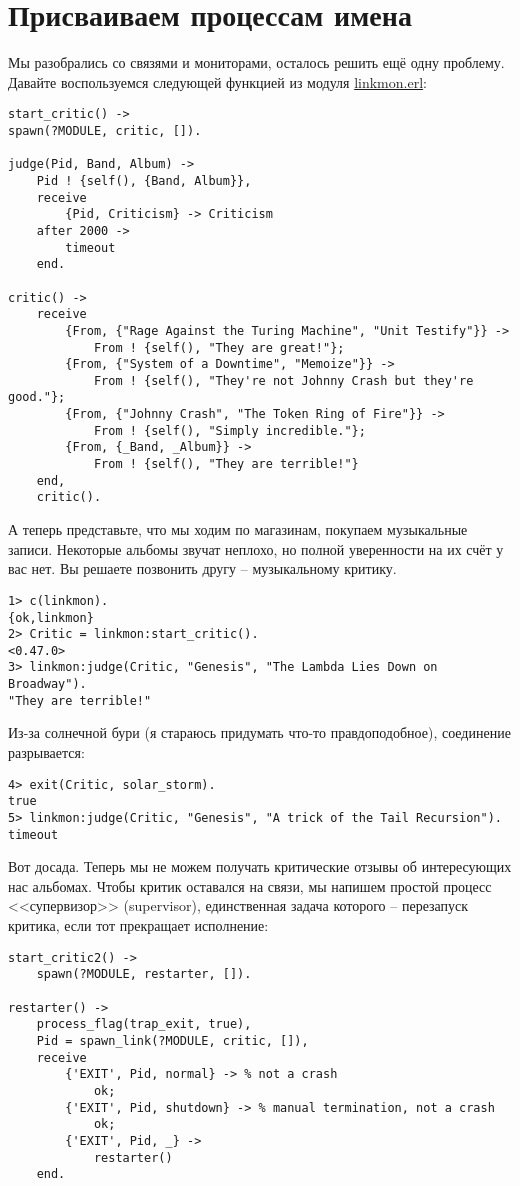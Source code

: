 \section{Присваиваем процессам имена}
\label{naming-processes}
Мы разобрались со связями и мониторами, осталось решить ещё одну проблему.
Давайте воспользуемся следующей функцией из модуля \href{http://learnyousomeerlang/original/learnyousomeerlang.com/static/erlang/linkmon.erl}{linkmon.erl}:
\begin{lstlisting}[style=erlang]
start_critic() ->
spawn(?MODULE, critic, []).
 
judge(Pid, Band, Album) ->
    Pid ! {self(), {Band, Album}},
    receive
        {Pid, Criticism} -> Criticism
    after 2000 ->
        timeout
    end.
 
critic() ->
    receive
        {From, {"Rage Against the Turing Machine", "Unit Testify"}} ->
            From ! {self(), "They are great!"};
        {From, {"System of a Downtime", "Memoize"}} ->
            From ! {self(), "They're not Johnny Crash but they're good."};
        {From, {"Johnny Crash", "The Token Ring of Fire"}} ->
            From ! {self(), "Simply incredible."};
        {From, {_Band, _Album}} ->
            From ! {self(), "They are terrible!"}
    end,
    critic().
\end{lstlisting}

А теперь представьте, что мы ходим по магазинам, покупаем музыкальные записи.
Некоторые альбомы звучат неплохо, но полной уверенности на их счёт у вас нет.
Вы решаете позвонить другу \--- музыкальному критику.
\begin{lstlisting}[style=erlang]
1> c(linkmon).                        
{ok,linkmon}
2> Critic = linkmon:start_critic().
<0.47.0>
3> linkmon:judge(Critic, "Genesis", "The Lambda Lies Down on Broadway").
"They are terrible!"
\end{lstlisting}

Из\--за солнечной бури (я стараюсь придумать что\--то правдоподобное), соединение разрывается:
\begin{lstlisting}[style=erlang]
4> exit(Critic, solar_storm).
true
5> linkmon:judge(Critic, "Genesis", "A trick of the Tail Recursion").
timeout
\end{lstlisting}

Вот досада.
Теперь мы не можем получать критические отзывы об интересующих нас альбомах.
Чтобы критик оставался на связи, мы напишем простой процесс <<супервизор>> (supervisor), единственная задача которого \--- перезапуск критика, если тот прекращает исполнение:
\begin{lstlisting}[style=erlang]
start_critic2() ->
    spawn(?MODULE, restarter, []).
 
restarter() ->
    process_flag(trap_exit, true),
    Pid = spawn_link(?MODULE, critic, []),
    receive
        {'EXIT', Pid, normal} -> % not a crash
            ok;
        {'EXIT', Pid, shutdown} -> % manual termination, not a crash
            ok;
        {'EXIT', Pid, _} ->
            restarter()
    end.
\end{lstlisting}

